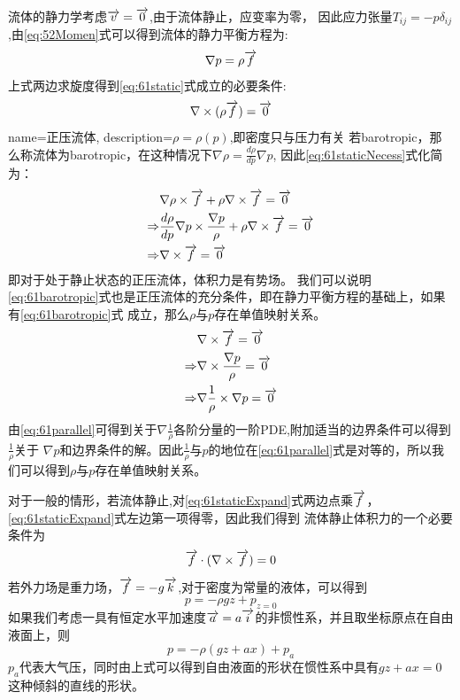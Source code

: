 流体的静力学考虑$\overrightarrow{v}=\overrightarrow{0}$,由于流体静止，应变率为零，
因此应力张量$T_{ij}=-p\delta_{ij}$,由\eqref{eq:52Momen}式可以得到流体的静力平衡方程为:
\begin{equation}\label{eq:61static}
\nabla p = \rho \overrightarrow{f}
\end{equation}
上式两边求旋度得到\eqref{eq:61static}式成立的必要条件:
\begin{equation}\label{eq:61staticNecess}
\nabla \times (\rho \overrightarrow{f})=\overrightarrow{0}
\end{equation}
{
  name=正压流体,
  description={$\rho=\rho(p)$,即密度只与压力有关}
}
若\glsdesc{barotropic}，那么称流体为\gls{barotropic}，在这种情况下$\nabla \rho=\frac{d\rho}{dp}\nabla p$,
因此\eqref{eq:61staticNecess}式化简为：
\begin{align}
&\nabla \rho \times \overrightarrow{f} + \rho \nabla \times \overrightarrow{f} =  \overrightarrow{0}\label{eq:61staticExpand}\\
\Rightarrow & \frac{d\rho}{dp}\nabla p \times \frac{\nabla p}{\rho} + \rho \nabla \times \overrightarrow{f} =  \overrightarrow{0}\nonumber\\
\Rightarrow  &  \nabla \times \overrightarrow{f} =  \overrightarrow{0}\label{eq:61barotropic}
\end{align}
即对于处于静止状态的正压流体，体积力是有势场。
我们可以说明\eqref{eq:61barotropic}式也是正压流体的充分条件，即在静力平衡方程的基础上，如果有\eqref{eq:61barotropic}式
成立，那么$\rho$与$p$存在单值映射关系。
\begin{align}
&\nabla \times \overrightarrow{f} =  \overrightarrow{0}\nonumber\\
\Rightarrow & \nabla \times \frac{\nabla p}{\rho} =  \overrightarrow{0}\nonumber\\
\Rightarrow  &   \nabla \frac{1}{\rho} \times \nabla p =  \overrightarrow{0}\label{eq:61parallel}
\end{align}
由\eqref{eq:61parallel}可得到关于$\nabla \frac{1}{\rho}$各阶分量的一阶PDE,附加适当的边界条件可以得到$\frac{1}{\rho}$关于
$\nabla p$和边界条件的解。因此$\frac{1}{\rho}$与$p$的地位在\eqref{eq:61parallel}式是对等的，所以我们可以得到$\rho$与$p$存在单值映射关系。

对于一般的情形，若流体静止,对\eqref{eq:61staticExpand}式两边点乘$\overrightarrow{f}$，\eqref{eq:61staticExpand}式左边第一项得零，因此我们得到
流体静止体积力的一个必要条件为
\begin{equation}
\overrightarrow{f}\cdot (\nabla \times \overrightarrow{f})=0
\end{equation}
若外力场是重力场，$\overrightarrow{f}=-g\overrightarrow{k}$,对于密度为常量的液体，可以得到
\begin{equation}
p=-\rho g z + p_{z=0}
\end{equation}
如果我们考虑一具有恒定水平加速度$\overrightarrow{a}=a\overrightarrow{i}$的非惯性系，并且取坐标原点在自由液面上，则
\begin{equation}
p=-\rho(gz+ax)+p_a
\end{equation}
$p_a$代表大气压，同时由上式可以得到自由液面的形状在惯性系中具有$gz+ax=0$这种倾斜的直线的形状。
